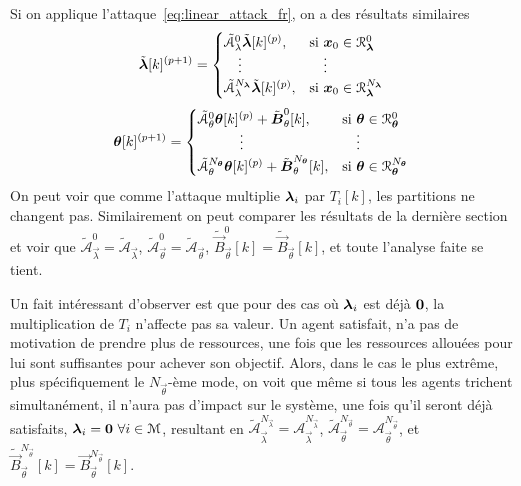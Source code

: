 \documentclass[../main.tex]{subfiles}
\begin{document}
Si on applique l'attaque~\eqref{eq:linear_attack_fr}, on a des résultats similaires
\begin{equation}
  \label{eq:negotiation_equation_substituting_organizing_matrix_lambda_switched_cheating_fr}
  \tilde{\vec{\lambda}}[k]\pplusone=
  \begin{cases}
    \tilde{\mathcal{A}}_{\lambda}^{0}\tilde{\vec{\lambda}}[k]\p,&\text{si}\ \vec{x}_{0}\in\set{R}_{\vec{\lambda}}^{0}\\
    \quad\vdots&\quad\vdots\\
    \tilde{\mathcal{A}}_{\lambda}^{N_{\vec{\lambda}}}\tilde{\vec{\lambda}}[k]\p,&\text{si}\ \vec{x}_{0}\in\set{R}_{\vec{\lambda}}^{N_{\vec{\lambda}}}\\
  \end{cases}
\end{equation}
\begin{equation}
  \label{eq:negotiation_equation_substituting_organizing_matrix_theta_switched_cheating_fr}
  \vec{\theta}[k]\pplusone=
  \begin{cases}
    \tilde{\mathcal{A}}_{\theta}^{0}\vec{\theta}[k]\p+\mathcal{\tilde{\vec{B}}}_{\theta}^{0}[k],&\text{si}\ \vec{\theta}\in\set{R}_{\vec{\theta}}^{0}\\
    \qquad\quad \vdots&\quad \vdots\\
    \tilde{\mathcal{A}}_{\theta}^{N_{\vec{\theta}}}\vec{\theta}[k]\p+\mathcal{\tilde{\vec{B}}}_{\theta}^{N_{\vec{\theta}}}[k],&\text{si}\ \vec{\theta}\in\set{R}_{\vec{\theta}}^{N_{\vec{\theta}}}\\
  \end{cases}
\end{equation}
On peut voir que comme l'attaque multiplie $\boldsymbol{\lambda}_{i}$ par $T_{i}[k]$, les partitions ne changent pas.
Similairement on peut comparer les résultats de la dernière section et voir que
$\tilde{\mathcal{A}}_{\vec{\lambda}}^{0}=\tilde{\mathcal{A}}_{\vec{\lambda}}$,
$\tilde{\mathcal{A}}_{\vec{\theta}}^{0}=\tilde{\mathcal{A}}_{\vec{\theta}}$,
$\tilde{\vec{B}}_{\vec{\theta}}^{0}[k]=\tilde{\vec{B}}_{\vec{\theta}}[k]$, et toute l'analyse faite se tient.

\begin{remark}\label{rem:cheat_satisfied_problem}
  Un fait intéressant d'observer est que pour des cas où $\boldsymbol{\lambda}_{i}$ est déjà $\mathbf{0}$, la multiplication de $T_{i}$ n'affecte pas sa valeur.
  Un agent satisfait, n'a pas de motivation de prendre plus de ressources, une fois que les ressources allouées pour lui sont suffisantes pour achever son objectif.
  Alors, dans le cas le plus extrême, plus spécifiquement le $N_{\vec{\theta}}$-ème mode, on voit que même si tous les agents trichent simultanément, il n'aura pas d'impact sur le système, une fois qu'il seront déjà satisfaits, $\boldsymbol{\lambda}_{i}=\mathbf{0}\ \forall i \in \mathcal{M}$, resultant en
  $\tilde{\mathcal{A}}_{\vec{\lambda}}^{N_{\vec{\lambda}}}=\mathcal{A}_{\vec{\lambda}}^{N_{\vec{\lambda}}}$,
  $\tilde{\mathcal{A}}_{\vec{\theta}}^{N_{\vec{\theta}}}=\mathcal{A}_{\vec{\theta}}^{N_{\vec{\theta}}}$, et
  $\tilde{\vec{B}}_{\vec{\theta}}^{N_{\vec{\theta}}}[k]=\vec{B}_{\vec{\theta}}^{N_{\vec{\theta}}}[k]$.
\end{remark}
\end{document}
